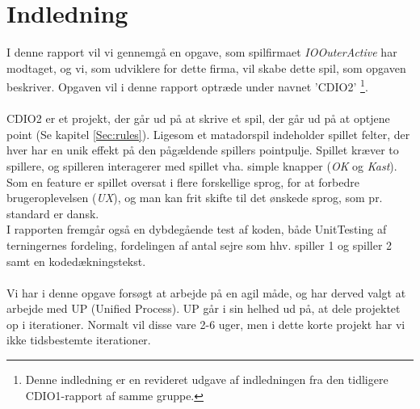 \chapter{Indledning}
I denne rapport vil vi gennemgå en opgave, som spilfirmaet \textit{IOOuterActive} har modtaget, og vi, som udviklere for dette firma, vil skabe dette spil, som opgaven beskriver.
Opgaven vil i denne rapport optræde under navnet 'CDIO2' \footnote{Denne indledning er en revideret udgave af indledningen fra den tidligere CDIO1-rapport af samme gruppe.}.
\\\\CDIO2 er et projekt, der går ud på at skrive et spil, der går ud på at optjene point (Se kapitel \ref{Sec:rules}).
Ligesom et matadorspil indeholder spillet felter, der hver har en unik effekt på den pågældende spillers pointpulje.
Spillet kræver to spillere, og spilleren interagerer med spillet vha. simple knapper (\textit{OK} og \textit{Kast}).
Som en feature er spillet oversat i flere forskellige sprog, for at forbedre brugeroplevelsen (\textit{UX}), og man kan frit skifte til det ønskede sprog, som pr. standard er dansk.
\\I rapporten fremgår også en dybdegående test af koden, både UnitTesting af terningernes fordeling, fordelingen af antal sejre som hhv. spiller 1 og spiller 2 samt en kodedækningstekst.
\\\\Vi har i denne opgave forsøgt at arbejde på en agil måde, og har derved valgt at arbejde med UP (Unified Process). 
UP går i sin helhed ud på, at dele projektet op i iterationer.
Normalt vil disse vare 2-6 uger, men i dette korte projekt har vi ikke tidsbestemte iterationer.

